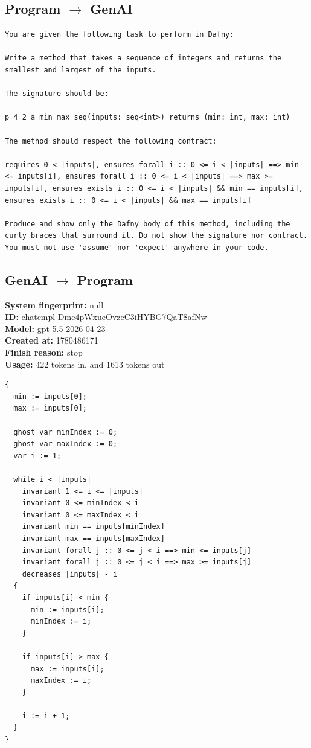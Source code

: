\documentclass{article}
\begin{document}
\subsection*{Program $\rightarrow$ GenAI}
\begin{lstlisting}
You are given the following task to perform in Dafny:

Write a method that takes a sequence of integers and returns the smallest and largest of the inputs.

The signature should be:

p_4_2_a_min_max_seq(inputs: seq<int>) returns (min: int, max: int)

The method should respect the following contract:

requires 0 < |inputs|, ensures forall i :: 0 <= i < |inputs| ==> min <= inputs[i], ensures forall i :: 0 <= i < |inputs| ==> max >= inputs[i], ensures exists i :: 0 <= i < |inputs| && min == inputs[i], ensures exists i :: 0 <= i < |inputs| && max == inputs[i]

Produce and show only the Dafny body of this method, including the curly braces that surround it. Do not show the signature nor contract. You must not use 'assume' nor 'expect' anywhere in your code.
\end{lstlisting}
\subsection*{GenAI $\rightarrow$ Program}
\textbf{System fingerprint: }null
\\\textbf{ID: }chatcmpl-Dme4pWxueOvzeC3iHYBG7QaT8afNw
\\\textbf{Model: }gpt-5.5-2026-04-23
\\\textbf{Created at: }1780486171
\\\textbf{Finish reason: }stop
\\\textbf{Usage: }422 tokens in, and 1613 tokens out
\begin{lstlisting}
{
  min := inputs[0];
  max := inputs[0];

  ghost var minIndex := 0;
  ghost var maxIndex := 0;
  var i := 1;

  while i < |inputs|
    invariant 1 <= i <= |inputs|
    invariant 0 <= minIndex < i
    invariant 0 <= maxIndex < i
    invariant min == inputs[minIndex]
    invariant max == inputs[maxIndex]
    invariant forall j :: 0 <= j < i ==> min <= inputs[j]
    invariant forall j :: 0 <= j < i ==> max >= inputs[j]
    decreases |inputs| - i
  {
    if inputs[i] < min {
      min := inputs[i];
      minIndex := i;
    }

    if inputs[i] > max {
      max := inputs[i];
      maxIndex := i;
    }

    i := i + 1;
  }
}
\end{lstlisting}
\end{document}
